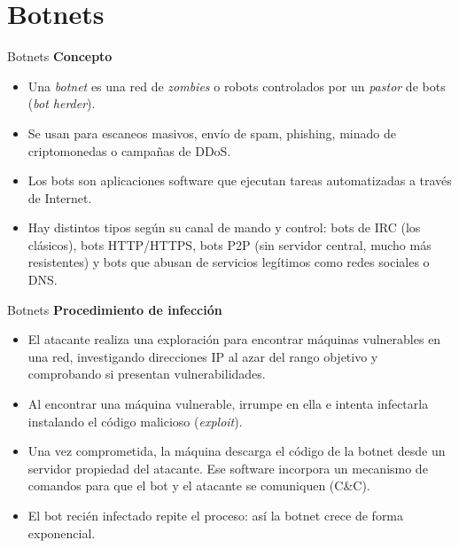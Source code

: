 \documentclass[aspectratio=169,11pt]{beamer}
\newcommand{\subt}[1]{{\color{uznavy}\bfseries #1}\par\smallskip}
\begin{document}
\section{Botnets}

\begin{frame}[allowframebreaks]{Botnets}
\small
\subt{Concepto}
  \begin{itemize}
  \item Una \emph{botnet} es una red de \emph{zombies} o robots controlados por un \emph{pastor} de bots (\emph{bot herder}).
  \item Se usan para escaneos masivos, envío de spam, phishing, minado de criptomonedas o campañas de DDoS.
  \item Los bots son aplicaciones software que ejecutan tareas automatizadas a través de Internet.
  \item Hay distintos tipos según su canal de mando y control: bots de IRC (los clásicos), bots HTTP/HTTPS, bots P2P (sin servidor central, mucho más resistentes) y bots que abusan de servicios legítimos como redes sociales o DNS.
  \end{itemize}
\end{frame}

\begin{frame}[allowframebreaks]{Botnets}
\small
\subt{Procedimiento de infección}
  \begin{itemize}
  \item El atacante realiza una exploración para encontrar máquinas vulnerables en una red, investigando direcciones IP al azar del rango objetivo y comprobando si presentan vulnerabilidades.
  \item Al encontrar una máquina vulnerable, irrumpe en ella e intenta infectarla instalando el código malicioso (\emph{exploit}).
  \item Una vez comprometida, la máquina descarga el código de la botnet desde un servidor propiedad del atacante. Ese software incorpora un mecanismo de comandos para que el bot y el atacante se comuniquen (C\&C).
  \item El bot recién infectado repite el proceso: así la botnet crece de forma exponencial.
  \end{itemize}
\end{frame}
\end{document}
